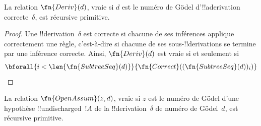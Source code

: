 \documentclass[../../../include/open-logic-section]{subfiles}
\begin{document}
\begin{prop}
  La relation $\fn{Deriv}(d)$, vraie si $d$ est le numéro de G\"odel
  d'!!a{derivation} correcte~$\delta$, est récursive primitive.
\end{prop}

\begin{proof}
  Une !!{derivation}~$\delta$ est correcte si chacune de ses
  inférences applique correctement une règle, c'est-à-dire si
  chacune de ses sous-!!{derivation}s se termine par une inférence
  correcte. Ainsi, $\fn{Deriv}(d)$ est vraie si et seulement si
  \[
  \bforall{i<\len{\fn{SubtreeSeq}(d)}}{\fn{Correct}((\fn{SubtreeSeq}(d))_i)}
  \]
\end{proof}

\begin{prop}
  La relation $\fn{OpenAssum}(z, d)$, vraie si $z$ est le numéro de
  G\"odel d'une hypothèse !!{undischarged}~$!A$ de la
  !!{derivation}~$\delta$
  de numéro de G\"odel~$d$, est récursive primitive.
\end{prop}
\end{document}
